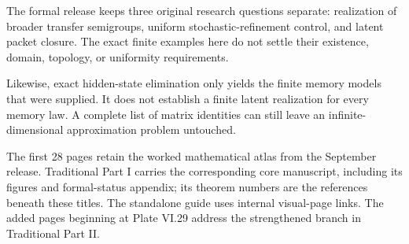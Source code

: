 The formal release keeps three original research questions separate: realization of broader transfer semigroups, uniform stochastic-refinement control, and latent packet closure. The exact finite examples here do not settle their existence, domain, topology, or uniformity requirements.

Likewise, exact hidden-state elimination only yields the finite memory models that were supplied. It does not establish a finite latent realization for every memory law. A complete list of matrix identities can still leave an infinite-dimensional approximation problem untouched.

The first 28 pages retain the worked mathematical atlas from the September release. Traditional Part I carries the corresponding core manuscript, including its figures and formal-status appendix; its theorem numbers are the references beneath these titles. The standalone guide uses internal visual-page links. The added pages beginning at Plate VI.29 address the strengthened branch in Traditional Part II.

